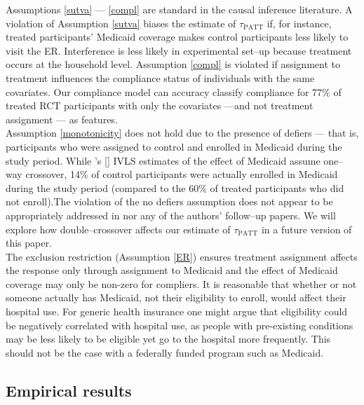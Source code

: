 \documentclass[12pt]{article}
\newcommand{\possessivecite}[1]{\citeauthor{#1}'s [\citeyear{#1}]}
\begin{document}
Assumptions \ref{sutva} ---  \ref{compl} are standard in the causal inference literature. A violation of Assumption \ref{sutva} biases the estimate of $\tau_{\text{PATT}}$ if, for instance, treated participants' Medicaid coverage makes control participants less likely to visit the ER. Interference is less likely in experimental set--up because treatment occurs at the household level.  Assumption \ref{compl} is violated if assignment to treatment influences the compliance status of individuals with the same covariates. Our compliance model can accuracy classify compliance for 77\% of treated RCT participants with only the covariates ---and not treatment assignment --- as features.\\
 
Assumption \ref{monotonicity} does not hold due to the presence of defiers --- that is, participants who were assigned to control and enrolled in Medicaid during the study period. While \possessivecite{finkelstein2012} IVLS estimates of the effect of Medicaid assume one--way crossover, 14\% of control participants were actually enrolled in Medicaid during the study period (compared to the 60\% of treated participants who did not enroll).The violation of the no defiers assumption does not appear to be appropriately addressed in \citet{finkelstein2012} nor any of the authors' follow--up papers. We will explore how double--crossover affects our estimate of  $\tau_{\text{PATT}}$ in a future version of this paper. \\

The exclusion restriction (Assumption \ref{ER}) ensures treatment assignment affects the response only through assignment to Medicaid  and the effect of Medicaid coverage may only be non-zero for compliers. It is reasonable that whether or not someone actually has Medicaid, not their eligibility to enroll, would affect their hospital use.  For generic health insurance one might argue that eligibility could be negatively correlated with hospital use, as people with pre-existing conditions may be less likely to be eligible yet go to the hospital more frequently.  This should not be the case with a federally funded program such as Medicaid. \\
 
\subsection{Empirical results}
\end{document}
